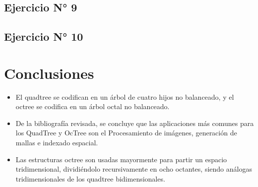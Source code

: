 \documentclass{article}
\begin{document}
\subsection{Ejercicio N° 9}
\subsection{Ejercicio N° 10}
\vspace{5mm}

\clearpage

\section{Conclusiones}
\begin{itemize}
	\item El quadtree se codifican en un árbol de cuatro hijos no balanceado, y el  octree se codifica en un árbol octal no balanceado.
	\item De la bibliografía revisada, se concluye que las aplicaciones más comunes para los QuadTree y OcTree son el Procesamiento de imágenes, generación de mallas e indexado espacial.
	\item Las estructuras octree son usadas mayormente para partir un espacio tridimensional, dividiéndolo recursivamente en ocho octantes, siendo análogas tridimensionales de los quadtree bidimensionales.
\end{itemize}

\clearpage
\end{document}
